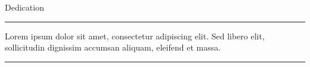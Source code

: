 \begin{vcenterpage}
{\LARGE{\sc Dedication}}

\noindent\rule[2pt]{\textwidth}{0.5pt}

Lorem ipsum dolor sit amet, consectetur adipiscing elit. Sed libero elit, sollicitudin dignissim accumsan aliquam, eleifend et massa. 

\noindent\rule[2pt]{\textwidth}{0.5pt}
\end{vcenterpage}
